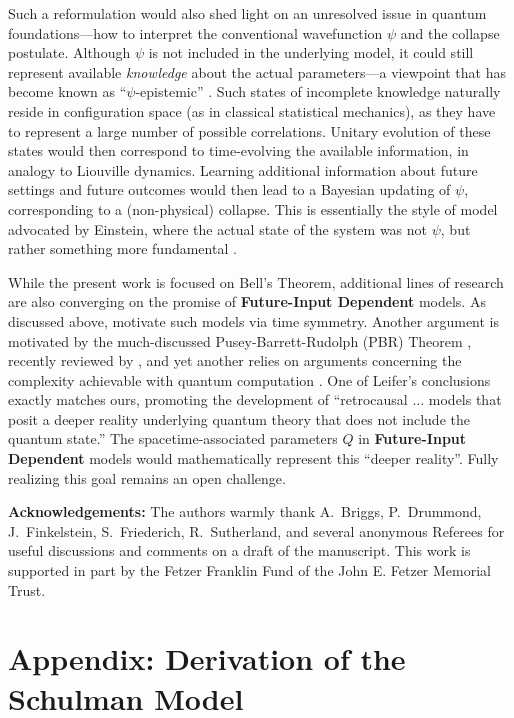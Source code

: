 \documentclass[onecolumn, nofootinbib, 12pt]{revtex4-1}
\begin{document}
Such a reformulation would also shed light on an unresolved issue in quantum foundations---how to interpret the conventional wavefunction $\psi$ and the collapse postulate.  Although $\psi$ is not included in the underlying model, it could still represent available \emph{knowledge} about the actual parameters---a viewpoint that has become known as ``$\psi$-epistemic'' \cite{spekkens2007}.  Such states of incomplete knowledge naturally reside in configuration space (as in classical statistical mechanics), as they have to represent a large number of possible correlations.  Unitary evolution of these states would then correspond to time-evolving the available information, in analogy to Liouville dynamics.  Learning additional information about future settings and future outcomes would then lead to a Bayesian updating of $\psi$, corresponding to a (non-physical) collapse.   This is essentially the style of model advocated by Einstein, where the actual state of the system was not $\psi$, but rather something more fundamental \cite{harrigan2010}.  

While the present work is focused on Bell's Theorem, additional lines of research are also converging on the promise of {\bf Future-Input Dependent} models.  As discussed above, \textcite{leifer2017a} motivate such models via time symmetry.  Another argument is motivated by the much-discussed Pusey-Barrett-Rudolph (PBR) Theorem \cite{pusey2012}, recently reviewed by \textcite{leifer2014}, and yet another relies on arguments concerning the complexity achievable with quantum computation \cite{argaman2019}. One of Leifer's conclusions exactly matches ours, promoting the development of ``retrocausal $\dots$ models that posit a deeper reality underlying quantum theory that does not include the quantum state.''  The spacetime-associated parameters $Q$ in {\bf Future-Input Dependent} models would mathematically represent this ``deeper reality''.  Fully realizing this goal remains an open challenge.

{\bf Acknowledgements:} The authors warmly thank A.~Briggs, P.~Drummond, J.~Finkelstein, S.~Friederich, R.~Sutherland, and several anonymous Referees for useful discussions and comments on a draft of the manuscript. This work is supported in part by the Fetzer Franklin Fund of the John E. Fetzer Memorial Trust.

\section*{Appendix: Derivation of the Schulman Model}
\end{document}
